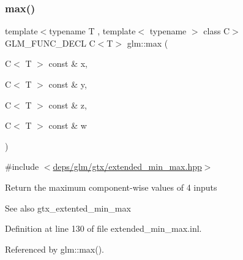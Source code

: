 \subsubsection{\texorpdfstring{max()}{max()}\hspace{0.1cm}{\footnotesize\ttfamily [6/6]}}
{\footnotesize\ttfamily template$<$typename T , template$<$ typename $>$ class C$>$ \\
G\+L\+M\+\_\+\+F\+U\+N\+C\+\_\+\+D\+E\+CL C$<$T$>$ glm\+::max (\begin{DoxyParamCaption}\item[{C$<$ T $>$ const \&}]{x,  }\item[{C$<$ T $>$ const \&}]{y,  }\item[{C$<$ T $>$ const \&}]{z,  }\item[{C$<$ T $>$ const \&}]{w }\end{DoxyParamCaption})}



{\ttfamily \#include $<$\hyperlink{extended__min__max_8hpp}{deps/glm/gtx/extended\+\_\+min\+\_\+max.\+hpp}$>$}

Return the maximum component-\/wise values of 4 inputs \begin{DoxySeeAlso}{See also}
gtx\+\_\+extented\+\_\+min\+\_\+max 
\end{DoxySeeAlso}


Definition at line 130 of file extended\+\_\+min\+\_\+max.\+inl.



Referenced by glm\+::max().

